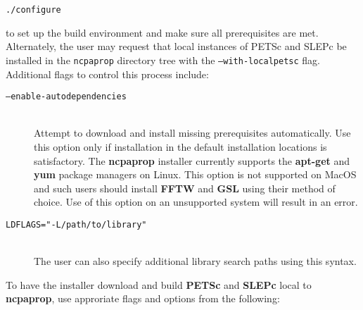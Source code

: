 \texttt{./configure}

\noindent
to set up the build environment and make sure all prerequisites are met.  Alternately, the user may request that local instances of PETSc and SLEPc be installed in the \texttt{ncpaprop} directory tree with the \texttt{--with-localpetsc} flag.  Additional flags to control this process include:

\begin{description}
\item[\texttt{--enable-autodependencies}]\hfill \\
\noindent
Attempt to download and install missing prerequisites automatically. Use this option only if installation in the default installation locations is satisfactory. The \textbf{ncpaprop} installer currently supports the \textbf{apt-get} and \textbf{yum} package managers on Linux.  This option is not supported on MacOS and such users should install \textbf{FFTW} and \textbf{GSL} using their method of choice.  Use of this option on an unsupported system will result in an error.

\item[\texttt{LDFLAGS="-L/path/to/library"}]\hfill \\
\noindent
The user can also specify additional library search paths using this syntax.
\end{description}

\noindent To have the installer download and build \textbf{PETSc} and \textbf{SLEPc} local to \textbf{ncpaprop}, use approriate flags and options from the following:

